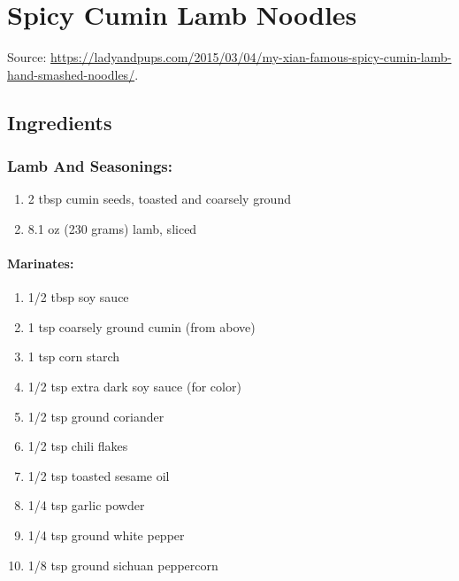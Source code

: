 \documentclass[]{article}
\providecommand{\tightlist}{%
  \setlength{\itemsep}{0pt}\setlength{\parskip}{0pt}}
\let\oldparagraph\paragraph
\renewcommand{\paragraph}[1]{\oldparagraph{#1}\mbox{}}
\begin{document}
\hypertarget{spicy-cumin-lamb-noodles}{%
\section{Spicy Cumin Lamb Noodles}\label{spicy-cumin-lamb-noodles}}

Source: \url{https://ladyandpups.com/2015/03/04/my-xian-famous-spicy-cumin-lamb-hand-smashed-noodles/}.

\hypertarget{ingredients}{%
\subsection{Ingredients}\label{ingredients}}

\hypertarget{lamb-and-seasonings}{%
\subsubsection{Lamb And Seasonings:}\label{lamb-and-seasonings}}

\begin{enumerate}
\def\labelenumi{\arabic{enumi}.}
\tightlist
\item
  2 tbsp cumin seeds, toasted and coarsely ground
\item
  8.1 oz (230 grams) lamb, sliced
\end{enumerate}

\hypertarget{marinates}{%
\paragraph{Marinates:}\label{marinates}}

\begin{enumerate}
\def\labelenumi{\arabic{enumi}.}
\tightlist
\item
  1/2 tbsp soy sauce
\item
  1 tsp coarsely ground cumin (from above)
\item
  1 tsp corn starch
\item
  1/2 tsp extra dark soy sauce (for color)
\item
  1/2 tsp ground coriander
\item
  1/2 tsp chili flakes
\item
  1/2 tsp toasted sesame oil
\item
  1/4 tsp garlic powder
\item
  1/4 tsp ground white pepper
\item
  1/8 tsp ground sichuan peppercorn
\end{enumerate}
\end{document}
